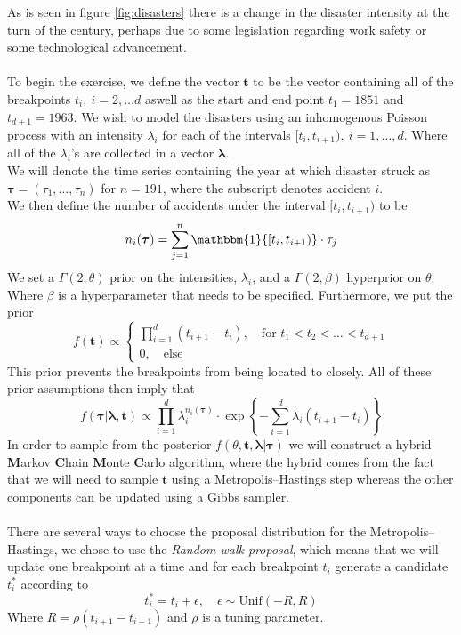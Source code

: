 As is seen in figure \ref{fig:disasters} there is a change in the disaster intensity at the turn of the century, perhaps due to some legislation regarding work safety or some technological advancement. \\ \\ To begin the exercise, we define the vector $\boldsymbol{t}$ to be the vector containing all of the breakpoints $t_i, \: i = 2,\dots d$ aswell as the start and end point $t_1 = 1851$ and $t_{d+1}=1963$. We wish to model the disasters using an inhomogenous Poisson process with an intensity $\lambda_i$ for each of the intervals $[t_i,t_{i+1}), \: i = 1,\dots,d$. Where all of the $\lambda_i$'s are collected in a vector $\boldsymbol{\lambda}$. \\ We will denote the time series containing the year at which disaster struck as $\boldsymbol{\tau} = (\tau_1,\dots,\tau_n)$ for $n = 191$, where the subscript denotes accident $i$. \\ We then define the number of accidents under the interval $[t_i,t_{i+1})$ to be
\[n_i(\boldsymbol{\tau}) = \sum^n_{j = 1}\mathbbm{1}\{[t_i,t_{i+1})\}\cdot \tau_j \]
We set a $\Gamma(2,\theta)$ prior on the intensities, $\lambda_i$, and a $\Gamma(2,\beta)$ hyperprior on $\theta$. Where $\beta$ is a hyperparameter that needs to be specified. Furthermore, we put the prior
\[ f(\boldsymbol{t}) \propto\left\{
	\begin{array}{l}
		\prod^d_{i = 1}(t_{i+1} - t_i), \quad \text{for } t_1 < t_2 < \dots < t_{d+1} \\
		0, \quad \text{else} 
	\end{array}
\right. \]
 This prior prevents the breakpoints from being located to closely. All of these prior assumptions then imply that 
\[f(\boldsymbol{\tau} | \boldsymbol{\lambda}, \boldsymbol{t}) \propto \prod^d_{i = 1}\lambda_i^{n_i(\boldsymbol{\tau})}\cdot\exp \left \{ - \sum^d_{i = 1}\lambda_i(t_{i+1} - t_i) \right \} \]
In order to sample from the posterior $f(\theta,\boldsymbol{t},\boldsymbol{\lambda} | \boldsymbol{\tau})$ we will construct a hybrid \textbf{M}arkov \textbf{C}hain \textbf{M}onte \textbf{C}arlo algorithm, where the hybrid comes from the fact that we will need to sample $\boldsymbol{t}$ using a Metropolis--Hastings step whereas the other components can be updated using a Gibbs sampler. \\ \\ There are several ways to choose the proposal distribution for the Metropolis--Hastings, we chose to use the \textit{Random walk proposal}, which means that we will update one breakpoint at a time and for each breakpoint $t_i$ generate a candidate $t^*_i$ according to
\[t^*_i = t_i + \epsilon, \quad \epsilon \sim \text{Unif}(-R,R) \]
Where $R = \rho(t_{i+1} - t_{i-1})$ and $\rho$ is a tuning parameter.

